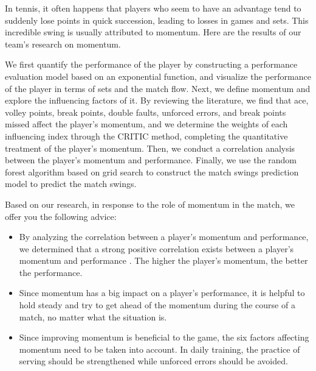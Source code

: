 \documentclass[12pt]{article}  %
\begin{document}
\memodate{\today}
\begin{memo}[Memorandum]
	In tennis, it often happens that players who seem to have an advantage tend to suddenly lose points in quick succession, leading to losses in games and sets. This incredible swing is usually attributed to momentum. Here are the results of our team's research on momentum.
	
	We first quantify the performance of the player by constructing a performance evaluation model based on an exponential function, and visualize the performance of the player in terms of sets and the match flow. Next, we define momentum and explore the influencing factors of it. By reviewing the literature, we find that ace, volley points, break points, double faults, unforced errors, and break points missed affect the player's momentum, and we determine the weights of each influencing index through the CRITIC method, completing the quantitative treatment of the player's momentum. Then, we conduct a correlation analysis between the player's momentum and performance. Finally, we use the random forest algorithm based on grid search to construct the match swings prediction model to predict the match swings.
	
	Based on our research, in response to the role of momentum in the match, we offer you the following advice:
	\begin{itemize}
		\setlength{\parsep}{0ex} 
		\setlength{\topsep}{2ex} 
		\setlength{\itemsep}{1ex} 
		\item  By analyzing the correlation between a player's momentum and performance, we determined that a strong positive correlation exists between a player's momentum and performance . The higher the player's momentum, the better the performance.
		\item Since momentum has a big impact on a player's performance, it is helpful to hold steady and try to get ahead of the momentum during the course of a match, no matter what the situation is.
		\item Since improving momentum is beneficial to the game, the six factors affecting momentum need to be taken into account. In daily training, the practice of serving should be strengthened while unforced errors should be avoided.
	\end{itemize}
	

\end{memo}
\end{document}
